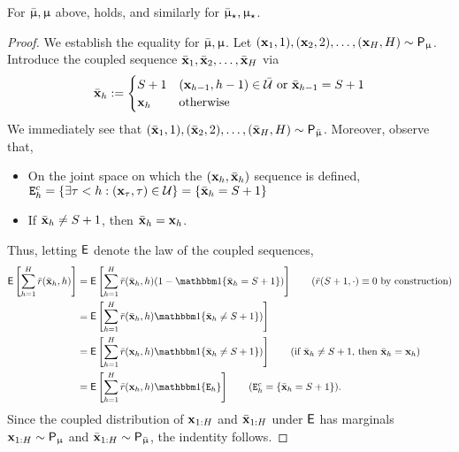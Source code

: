 	\begin{claim}\label{claim:expected_reward_identity} For $\bar{\upmu},\upmu$ above,  holds, and similarly for $\bar{\upmu}_{\star},\upmu_{\star}$.
	\end{claim}
	\begin{proof}

		\newcommand{\barbmx}{\bar{\bmx}}
		We establish the equality for $\bar{\upmu},\upmu$. Let $(\mathbf{x}_1,1),(\mathbf{x}_2,2),\dots,(\mathbf{x}_H,H) \sim \mathsf{P}_{\upmu}$. Introduce the coupled sequence $\barbmx_1,\barbmx_2,\dots,\barbmx_H$ via
		\begin{align*}
		\barbmx_h := \begin{cases} S+ 1& (\bmx_{h-1},h-1) \in \calUbar \text{ or } \barbmx_{h-1} = S+1\\
		\bmx_h & \text{otherwise}\end{cases}
		\end{align*}
		We immediately see that $(\barbmx_1,1),(\barbmx_2,2),\dots,(\barbmx_H,H) \sim \sfP_{\barmod}$. Moreover, observe that,
		\begin{itemize}
			\item On the joint space on which the $(\bmx_h,\barbmx_h)$ sequence is defined, $\scrE_h^c = \{\exists \tau < h: (\bmx_{\tau},\tau) \in \calU\} =\{ \barbmx_h = S+1\}$
			\item If $\barbmx_h \ne S+1$, then $\barbmx_h = \bmx_h$.
		\end{itemize}
		Thus, letting $\mathsf{E}$ denote the law of the coupled sequences,
		\begin{align}
		\sfE\left[\sum_{h=1}^H \rbar(\barbmx_h,h)\right] &= \sfE\left[\sum_{h=1}^H \rbar(\barbmx_h,h)(1 - \ind\{ \barbmx_h = S+1\})\right] \tag{$\rbar(S+1,\cdot) \equiv 0$ by construction}\\
		&=\sfE\left[\sum_{h=1}^H \rbar(\barbmx_h,h)\ind\{ \barbmx_h \ne S+1\})\right] \nn\\
		&=\sfE\left[\sum_{h=1}^H \rbar(\bmx_h,h)\ind\{ \barbmx_h \ne S+1\})\right] \tag{if $\barbmx_h \ne S+1$, then $\barbmx_h = \bmx_h$}\\
		&= \sfE\left[\sum_{h=1}^H \rbar(\bmx_h,h)\ind\{\scrE_h\}\right] \tag{$\scrE_h^c = \{ \barbmx_h = S+1\}$}.
		\end{align}
		Since the coupled distribution of $\mathbf{x}_{1:H}$ and $\barbmx_{1:H}$ under $\mathsf{E}$ has marginals $\mathbf{x}_{1:H} \sim \mathsf{P}_{\upmu}$ and $\barbmx_{1:H} \sim \sfP_{\barmod}$, the indentity follows.
	\end{proof}

